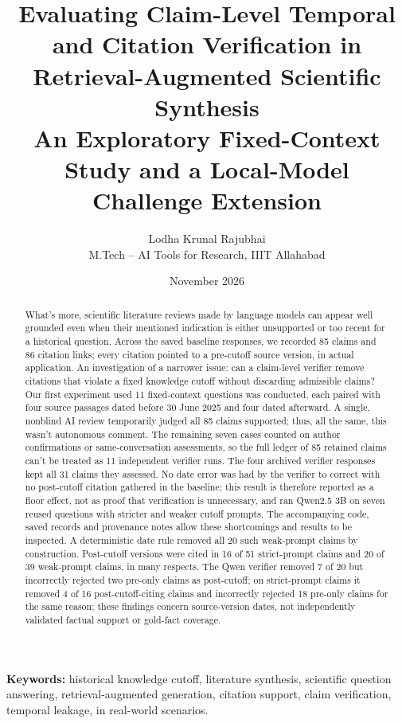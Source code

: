 \documentclass[12pt,a4paper]{article}
\title{Evaluating Claim-Level Temporal and Citation Verification in Retrieval-Augmented Scientific Synthesis\\[5pt]\large An Exploratory Fixed-Context Study and a Local-Model Challenge Extension}
\author{Lodha Krunal Rajubhai\\\small M.Tech -- AI Tools for Research, IIIT Allahabad}
\date{November 2026}
\begin{document}
\maketitle
\begin{abstract}
What's more, scientific literature reviews made by language models can appear well grounded even when their mentioned indication is either unsupported or too recent for a historical question. Across the saved baseline responses, we recorded 85 claims and 86 citation links; every citation pointed to a pre-cutoff source version, in actual application. An investigation of a narrower issue: can a claim-level verifier remove citations that violate a fixed knowledge cutoff without discarding admissible claims? Our first experiment used 11 fixed-context questions was conducted, each paired with four source passages dated before 30 June 2025 and four dated afterward. A single, nonblind AI review temporarily judged all 85 claims supported; thus, all the same, this wasn't autonomous comment. The remaining seven cases counted on author confirmations or same-conversation assessments, so the full ledger of 85 retained claims can't be treated as 11 independent verifier runs. The four archived verifier responses kept all 31 claims they assessed. No date error was had by the verifier to correct with no post-cutoff citation gathered in the baseline; this result is therefore reported as a floor effect, not as proof that verification is unnecessary, and ran Qwen2.5 3B on seven reused questions with stricter and weaker cutoff prompts. The accompanying code, saved records and provenance notes allow these shortcomings and results to be inspected. A deterministic date rule removed all 20 such weak-prompt claims by construction. Post-cutoff versions were cited in 16 of 51 strict-prompt claims and 20 of 39 weak-prompt claims, in many respects. The Qwen verifier removed 7 of 20 but incorrectly rejected two pre-only claims as post-cutoff; on strict-prompt claims it removed 4 of 16 post-cutoff-citing claims and incorrectly rejected 18 pre-only claims for the same reason; these findings concern source-version dates, not independently validated factual support or gold-fact coverage.
\end{abstract}

\noindent\textbf{Keywords:} historical knowledge cutoff, literature synthesis, scientific question answering, retrieval-augmented generation, citation support, claim verification, temporal leakage, in real-world scenarios.
\end{document}
